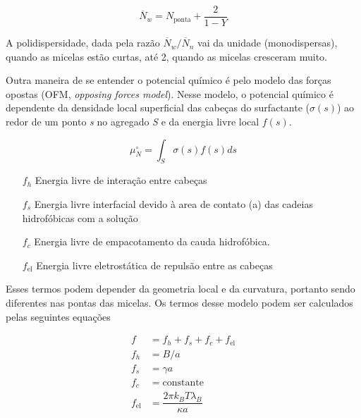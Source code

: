 		\begin{equation}
			\overline{N}_w = N_\mathrm{ponta} + \dfrac{2}{1 - Y}
			\label{eqn:distrib_tamanho_MG_reduzida_massa}
		\end{equation}
		
		A polidispersidade, dada pela razão \(\overline{N}_w / \overline{N}_n\) vai da unidade (monodispersas), quando as micelas estão curtas, até 2, quando as micelas cresceram muito. 
		
		Outra maneira de se entender o potencial químico é pelo modelo das forças opostas (OFM, \emph{opposing forces model}). Nesse modelo, o potencial químico é dependente da densidade local superficial das cabeças do surfactante (\(\sigma(s)\)) ao redor de um ponto \emph{s} no agregado \emph{S} e da energia livre local \(f(s)\). \cite{Giant_Micelles, May2001a}
		
		\begin{equation}
		\mu_N^\circ = \int_S \sigma(s) f(s) ds
		\label{eqn:OFM_potencial_quimico}
		\end{equation} 		%
		
		
		\begin{itemize}
			\item[\(f_h\)] Energia livre de interação entre cabeças
			\item[\(f_s\)] Energia livre interfacial devido à area de contato (a) das cadeias hidrofóbicas com a solução
			\item[\(f_c\)] Energia livre de empacotamento da cauda hidrofóbica.
			\item[\(f_\mathrm{el}\)] Energia livre eletrostática de repulsão entre as cabeças
		\end{itemize}
		
		Esses termos podem depender da geometria local e da curvatura, portanto sendo diferentes nas pontas das micelas. Os termos desse modelo podem ser calculados pelas seguintes equações \cite{Giant_Micelles}
		
		\begin{subequations}
			\begin{align}
				f   &= f_h + f_s + f_c + f_\mathrm{el} \\
				f_h &= B / a     \\
				f_s &= \gamma a  \\
				f_c &= \mathrm{constante}  \\
				f_\mathrm{el} &= \dfrac{2\pi k_BT\lambda_B}{\kappa a}
			\end{align}
			\label{eqn:componentes_OFM}
		\end{subequations}
		
